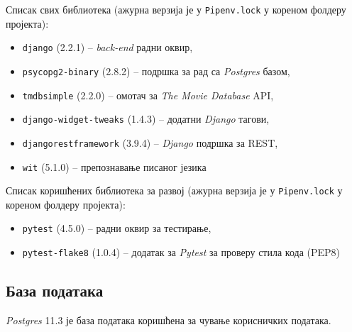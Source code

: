 Списак свих библиотека (ажурна верзија је у \verb|Pipenv.lock| у кореном
фолдеру пројекта):

\vspace{0.2cm}
\begin{itemize}[noitemsep]
    \item \verb|django| (2.2.1) -- \textit{back-end} радни оквир,
    \item \verb|psycopg2-binary| (2.8.2) -- подршка за рад са \textit{Postgres}
        базом,
    \item \verb|tmdbsimple| (2.2.0) -- омотач за \textit{The Movie Database}
        API,
    \item \verb|django-widget-tweaks| (1.4.3) -- додатни \textit{Django} тагови,
    \item \verb|djangorestframework| (3.9.4) -- \textit{Django} подршка за REST,
    \item \verb|wit| (5.1.0) -- препознавање писаног језика
\end{itemize}

\vspace{0.4cm}

Списак коришћених библиотека за развој (ажурна верзија је у \verb|Pipenv.lock| у
кореном фолдеру пројекта):

\vspace{0.2cm}
\begin{itemize}[noitemsep]
    \item \verb|pytest| (4.5.0) -- радни оквир за тестирање,
    \item \verb|pytest-flake8| (1.0.4) -- додатак за \textit{Pytest} за проверу
        стила кода (PEP8)
\end{itemize}

\subsection{База података}

\textit{Postgres} 11.3 је база података коришћена за чување корисничких
података.

